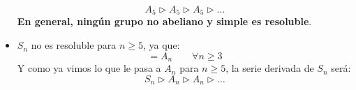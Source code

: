 \begin{ejemplo}
\begin{itemize}
            \begin{equation*}
                A_5 \rhd A_5 \rhd A_5 \rhd \ldots
            \end{equation*}
            \textbf{En general, ningún grupo no abeliano y simple es resoluble}.
        \item $S_n$ no es resoluble para $n\geq 5$, ya que:
            \begin{equation*}
                [S_n, S_n] = A_n  \qquad \forall n\geq 3
            \end{equation*}
            Y como ya vimos lo que le pasa a $A_n$ para $n\geq 5$, la serie derivada de $S_n$ será:
            \begin{equation*}
                S_n \rhd A_n \rhd A_n \rhd \ldots
            \end{equation*}
    \end{itemize}
\end{ejemplo}

